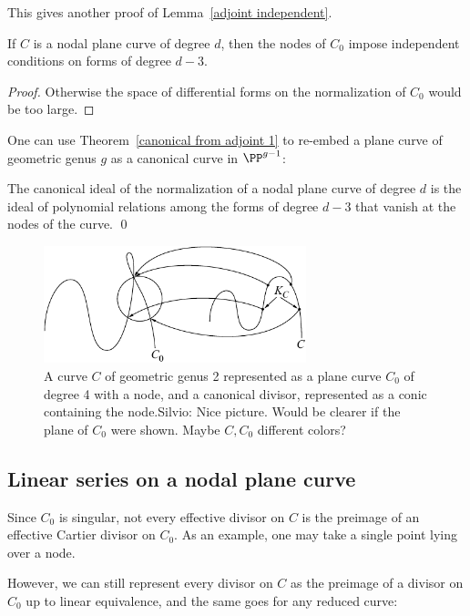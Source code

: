 This gives another proof of Lemma~\ref{adjoint independent}.

\begin{corollary}
If $C$ is a nodal plane curve of degree $d$, then the nodes of $C_{0}$ impose independent
conditions on forms of degree $d-3$.
\end{corollary}
\begin{proof}
 Otherwise the space of differential forms on the normalization of $C_{0}$ would be too large.
\end{proof}

One can use Theorem~\ref{canonical from adjoint 1} to re-embed a plane curve of 
geometric genus $g$ as a canonical
curve in $\PP^{g-1}$:

\begin{corollary}
 The canonical ideal of the normalization of a nodal plane curve of degree $d$ is the ideal of polynomial relations
 among the forms of degree $d-3$ that vanish at the nodes of the curve. \qed
\end{corollary}

\begin{figure}
\centerline {\includegraphics[width=3in]{"main/Fig14-2"}}
\caption{A curve $C$ of geometric genus 2 represented as a plane curve $C_{0}$ of degree 4 with a node, and a canonical divisor, represented as a conic containing the node.{Silvio: Nice picture. Would be clearer if the plane of $C_{0}$ were shown. Maybe $C,C_{0}$ different colors?}}
\end{figure}

\subsection{Linear series on a nodal plane curve}\label{linear series on nodal plane curves}

Since $C_{0}$ is singular, not every effective divisor on $C$ is the preimage of an
effective Cartier divisor on $C_{0}$. As an example, one may take a single point lying over a node. 

However,
we can still represent every divisor on $C$ as the preimage of a divisor on $C_{0}$ up to linear
equivalence, and the same goes for any reduced curve:


